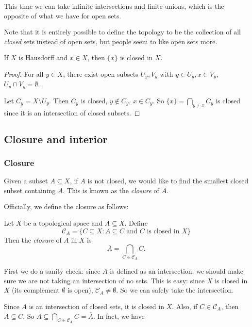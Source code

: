 \documentclass[a4paper]{article}
\begin{document}
This time we can take infinite intersections and finite unions, which is the opposite of what we have for open sets.

Note that it is entirely possible to define the topology to be the collection of all \emph{closed} sets instead of open sets, but people seem to like open sets more.

\begin{cor}
  If $X$ is Hausdorff and $x\in X$, then $\{x\}$ is closed in $X$.
\end{cor}

\begin{proof}
  For all $y\in X$, there exist open subsets $U_y, V_y$ with $y\in U_y, x\in V_y$, $U_y \cap V_y = \emptyset$.

  Let $C_y = X\setminus U_y$. Then $C_y$ is closed, $y\not\in C_y$, $x\in C_y$. So $\{x\} = \bigcap_{y\not= x} C_y$ is closed since it is an intersection of closed subsets.
\end{proof}
\subsection{Closure and interior}
\subsubsection{Closure}
Given a subset $A\subseteq X$, if $A$ is not closed, we would like to find the smallest closed subset containing $A$. This is known as the \emph{closure} of $A$.

Officially, we define the closure as follows:

\begin{defi}
  Let $X$ be a topological space and $A\subseteq X$. Define
  \[
    \mathcal{C}_A = \{C\subseteq X: A\subseteq C\text{ and }C\text{ is closed in }X\}
  \]
  Then the \emph{closure} of $A$ in $X$ is
  \[
    \bar A = \bigcap_{C\in \mathcal{C}_A} C.
  \]
\end{defi}
First we do a sanity check: since $\bar A$ is defined as an intersection, we should make sure we are not taking an intersection of no sets. This is easy: since $X$ is closed in $X$ (its complement $\emptyset$ is open), $\mathcal{C}_A \not= \emptyset$. So we can safely take the intersection.

Since $\bar A$ is an intersection of closed sets, it is closed in $X$. Also, if $C\in \mathcal{C}_A$, then $A\subseteq C$. So $A\subseteq \bigcap_{C\in \mathcal{C}_A} C = \bar A$. In fact, we have
\end{document}
